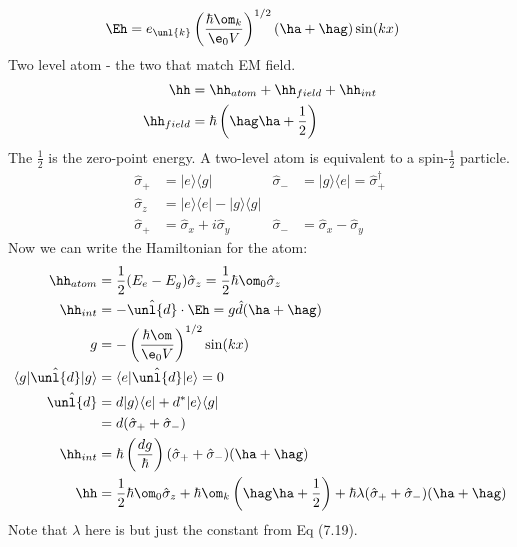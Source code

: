\documentclass[a4paper, 11pt, normalem]{report}
\newcommand\hsig{\hat{\sigma}}
\newcommand\hd{\hat{\unl{d}}}
\begin{document}
\begin{align}
    \Eh &= e_{\unl{k}}\left(\frac{\hbar\om_k}{\e_0V}\right)^{1/2}(\ha+\hag)\sin(kx)
\end{align}
Two level atom - the two that match EM field.
\begin{align}
    \hh &= \hh_{atom} + \hh_{field} + \hh_{int} \\
    \hh_{field} &= \hbar\left(\hag\ha + \frac12\right)
\end{align}
The $\frac12$ is the zero-point energy. 
A two-level atom is equivalent to a spin-$\frac12$ particle.
\begin{align}
    \hsig_+ &= |e\rangle\langle g| & \hsig_- &= |g\rangle\langle e| = \hsig^\dagger_+ \\
    \hsig_z &= |e\rangle\langle e| - |g\rangle\langle g| \\
    \hsig_+ &= \hsig_x + i\hsig_y & \hsig_- &= \hsig_x - \hsig_y
\end{align}
Now we can write the Hamiltonian for the atom:
\begin{align}
    \hh_{atom} &= \frac12(E_e - E_g)\hsig_z = \frac12\hbar\om_0\hsig_z \\
    \hh_{int} &= -\hd\cdot\Eh = g\hat{d}(\ha+\hag) \\
    g &= -\left(\frac{\hbar\om}{\e_0V}\right)^{1/2}\sin(kx) \\
    \langle g|\hd|g\rangle &= \langle e|\hd|e\rangle = 0 \\
    \hd &= d|g\rangle\langle e| + d^*|e\rangle\langle g| \\
        &= d(\hsig_+ + \hsig_-) \\
    \hh_{int} &= \hbar\left(\frac{dg}{\hbar}\right)(\hsig_+ +\hsig_-)(\ha+\hag) \\
    \hh &= \frac12\hbar\om_0\hsig_z + \hbar\om_k\left(\hag\ha+\frac12\right) + \hbar\lambda(\hsig_+ +\hsig_-)(\ha+\hag)
\end{align}
Note that $\lambda$ here is  but just the constant from Eq (7.19).
\end{document}
